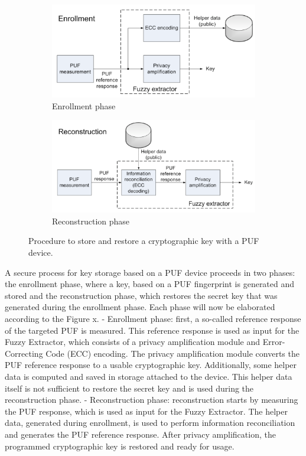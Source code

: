 \documentclass[USenglish]{article}
\begin{document}
\begin{figure}
	\centering
	\begin{subfigure}{.5\textwidth}
		\centering
		\includegraphics[width=.9\linewidth]{assets/puf_enrollment}
		\caption{Enrollment phase}
		\label{fig:puf_enrollment}
	\end{subfigure}%
	\begin{subfigure}{.5\textwidth}
		\centering
		\includegraphics[width=.9\linewidth]{assets/puf_reconstruction}
		\caption{Reconstruction phase}
		\label{fig:puf_reconstruction}
	\end{subfigure}
	\caption{Procedure to store and restore a cryptographic key with a PUF device.}
	\label{fig:puf_key_storage}
\end{figure}

A secure process for key storage based on a PUF device proceeds in two phases: the enrollment phase, where a key, based on a PUF fingerprint is generated and stored and the reconstruction phase, which restores the secret key that was generated during the enrollment phase.
Each phase will now be elaborated according to the Figure x.
- Enrollment phase: first, a so-called reference response of the targeted PUF is measured. This reference response is used as input for the Fuzzy Extractor, which consists of a privacy amplification module and Error-Correcting Code (ECC) encoding. The privacy amplification module converts the PUF reference response to a usable cryptographic key. Additionally, some helper data is computed and saved in storage attached to the device. This helper data itself is not sufficient to restore the secret key and is used during the reconstruction phase.
- Reconstruction phase: reconstruction starts by measuring the PUF response, which is used as input for the Fuzzy Extractor. The helper data, generated during enrollment, is used to perform information reconciliation and generates the PUF reference response. After privacy amplification, the programmed cryptographic key is restored and ready for usage.
\end{document}
